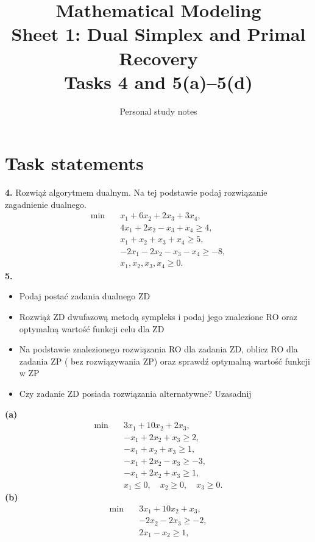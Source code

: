 \documentclass[11pt,a4paper]{article}
\title{\textbf{Mathematical Modeling}\\[2mm]
\large Sheet 1: Dual Simplex and Primal Recovery\\[1mm]
\normalsize Tasks 4 and 5(a)--5(d)}
\author{Personal study notes}
\date{}
\begin{document}
\maketitle
\tableofcontents

\section{Task statements}\label{sec:statements}
\begin{otherlanguage}{polish}
  \noindent\textbf{4.} Rozwiąż algorytmem dualnym. Na tej podstawie podaj rozwiązanie zagadnienie dualnego.
  \[
    \begin{aligned}
      \min\quad &x_1+6x_2+2x_3+3x_4,\\
      &4x_1+2x_2-x_3+x_4\geq4,\\
      &x_1+x_2+x_3+x_4\geq5,\\
      &-2x_1-2x_2-x_3-x_4\geq-8,\\
      &x_1,x_2,x_3,x_4\geq0.
    \end{aligned}
  \]
  \noindent\textbf{5.}
  \begin{itemize}[leftmargin=*]
    \item Podaj postać zadania dualnego ZD
    \item Rozwiąż ZD dwufazową metodą sympleks i podaj jego znalezione RO oraz optymalną wartość funkcji celu dla ZD
    \item Na podstawie znalezionego rozwiązania RO dla zadania ZD, oblicz RO dla zadania ZP ( bez rozwiązywania ZP) oraz sprawdź optymalną wartość funkcji w ZP
    \item Czy zadanie ZD posiada rozwiązania alternatywne? Uzasadnij
  \end{itemize}
  \noindent\textbf{(a)}
  \[
    \begin{aligned}
      \min\quad &3x_1+10x_2+2x_3,\\
      &-x_1+2x_2+x_3\geq2,\\
      &-x_1+x_2+x_3\geq1,\\
      &-x_1+2x_2-x_3\geq-3,\\
      &-x_1+2x_2+x_3\geq1,\\
      &x_1\leq0,\quad x_2\geq0,\quad x_3\geq0.
    \end{aligned}
  \]
  \noindent\textbf{(b)}
  \[
    \begin{aligned}
      \min\quad &3x_1+10x_2+x_3,\\
      &-2x_2-2x_3\geq-2,\\
      &2x_1-x_2\geq1,\\

\end{aligned}\]
\end{otherlanguage}
\end{document}
